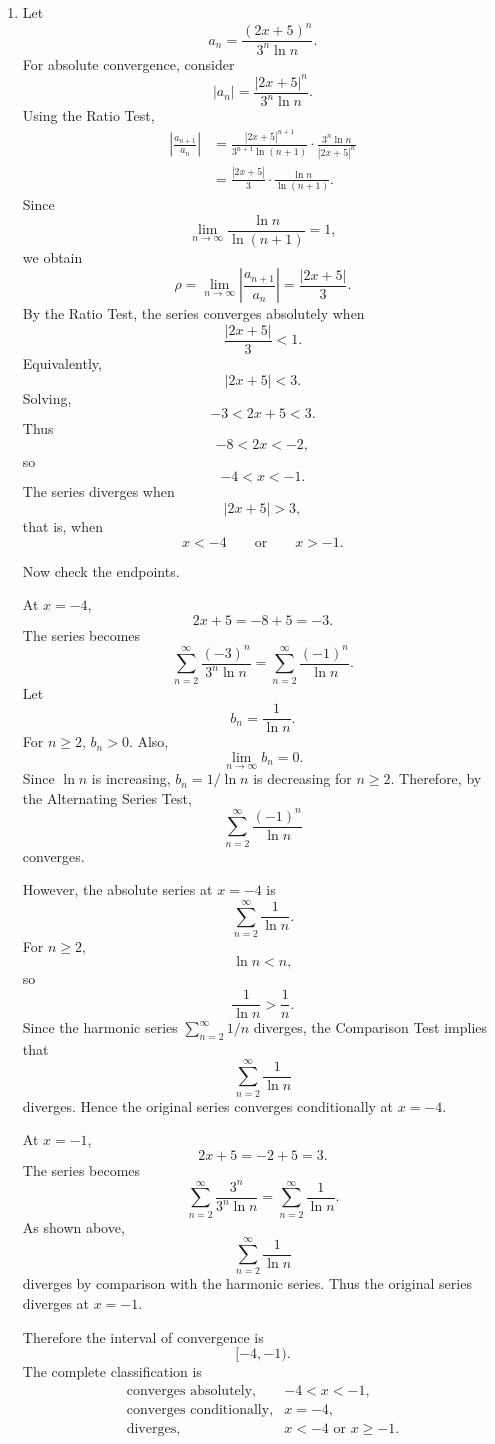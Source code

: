 \documentclass[12pt]{article}
\begin{document}
\begin{enumerate}[label=(\alph*)]
\item Let
\[
a_n=\frac{(2x+5)^n}{3^n\ln n}.
\]
For absolute convergence, consider
\[
|a_n|
=
\frac{|2x+5|^n}{3^n\ln n}.
\]
Using the Ratio Test,
\begin{align*}
\left|\frac{a_{n+1}}{a_n}\right|
&=
\frac{|2x+5|^{n+1}}{3^{n+1}\ln(n+1)}
\cdot
\frac{3^n\ln n}{|2x+5|^n}\\
&=
\frac{|2x+5|}{3}\cdot
\frac{\ln n}{\ln(n+1)}.
\end{align*}
Since
\[
\lim_{n\to\infty}\frac{\ln n}{\ln(n+1)}=1,
\]
we obtain
\[
\rho
=
\lim_{n\to\infty}
\left|\frac{a_{n+1}}{a_n}\right|
=
\frac{|2x+5|}{3}.
\]
By the Ratio Test, the series converges absolutely when
\[
\frac{|2x+5|}{3}<1.
\]
Equivalently,
\[
|2x+5|<3.
\]
Solving,
\[
-3<2x+5<3.
\]
Thus
\[
-8<2x<-2,
\]
so
\[
-4<x<-1.
\]
The series diverges when
\[
|2x+5|>3,
\]
that is, when
\[
x<-4
\qquad\text{or}\qquad
x>-1.
\]

Now check the endpoints.

At $x=-4$,
\[
2x+5=-8+5=-3.
\]
The series becomes
\[
\sum_{n=2}^{\infty}\frac{(-3)^n}{3^n\ln n}
=
\sum_{n=2}^{\infty}\frac{(-1)^n}{\ln n}.
\]
Let
\[
b_n=\frac1{\ln n}.
\]
For $n\ge2$, $b_n>0$. Also,
\[
\lim_{n\to\infty}b_n=0.
\]
Since $\ln n$ is increasing, $b_n=1/\ln n$ is decreasing for $n\ge2$. Therefore, by the Alternating Series Test,
\[
\sum_{n=2}^{\infty}\frac{(-1)^n}{\ln n}
\]
converges.

However, the absolute series at $x=-4$ is
\[
\sum_{n=2}^{\infty}\frac1{\ln n}.
\]
For $n\ge2$,
\[
\ln n<n,
\]
so
\[
\frac1{\ln n}>\frac1n.
\]
Since the harmonic series $\sum_{n=2}^{\infty}1/n$ diverges, the Comparison Test implies that
\[
\sum_{n=2}^{\infty}\frac1{\ln n}
\]
diverges. Hence the original series converges conditionally at $x=-4$.

At $x=-1$,
\[
2x+5=-2+5=3.
\]
The series becomes
\[
\sum_{n=2}^{\infty}\frac{3^n}{3^n\ln n}
=
\sum_{n=2}^{\infty}\frac1{\ln n}.
\]
As shown above,
\[
\sum_{n=2}^{\infty}\frac1{\ln n}
\]
diverges by comparison with the harmonic series. Thus the original series diverges at $x=-1$.

Therefore the interval of convergence is
\[
\boxed{[-4,-1)}.
\]
The complete classification is
\[
\boxed{
\begin{array}{ll}
\text{converges absolutely}, & -4<x<-1,\\[0.2em]
\text{converges conditionally}, & x=-4,\\[0.2em]
\text{diverges}, & x<-4\text{ or }x\ge -1.
\end{array}}
\]


\end{enumerate}
\end{document}

